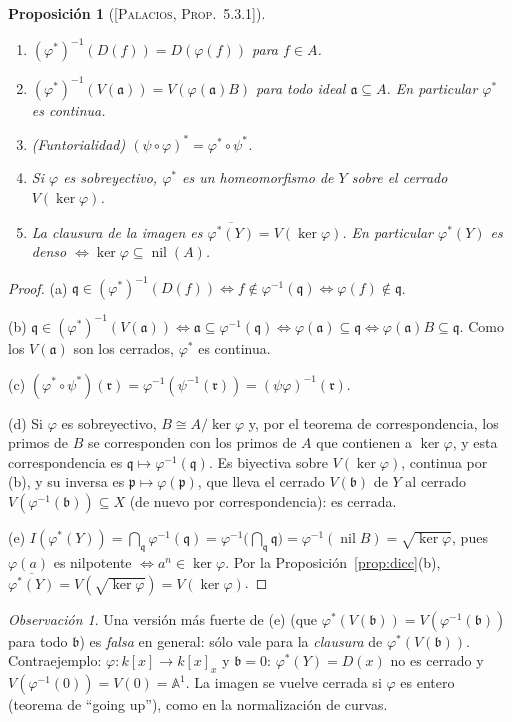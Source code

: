 \documentclass[11pt,a4paper]{article}
\newcommand{\nil}{\operatorname{nil}}
\newcommand{\A}{\mathbb{A}}
\newcommand{\pp}{\mathfrak{p}}
\newcommand{\qq}{\mathfrak{q}}
\newcommand{\aaa}{\mathfrak{a}}
\newcommand{\bbb}{\mathfrak{b}}
\theoremstyle{plain}
\newtheorem{proposicion}[teorema]{Proposición}
\theoremstyle{definition}
\theoremstyle{remark}
\newtheorem*{obs}{Observación}
\newcounter{ej}
\newcommand{\libro}[1]{\textsc{[Palacios, #1]}}
\begin{document}
\begin{proposicion}[{\libro{Prop.~5.3.1}}]\label{prop:phi}
\begin{enumerate}[label=(\alph*),itemsep=2pt]
\item $(\varphi^*)^{-1}(D(f))=D(\varphi(f))$ para $f\in A$.
\item $(\varphi^*)^{-1}(V(\aaa))=V(\varphi(\aaa)B)$ para todo ideal $\aaa\subseteq A$. En particular $\varphi^*$ es continua.
\item (\emph{Funtorialidad}) $(\psi\circ\varphi)^*=\varphi^*\circ\psi^*$.
\item Si $\varphi$ es \emph{sobreyectivo}, $\varphi^*$ es un homeomorfismo de $Y$ sobre el cerrado $V(\ker\varphi)$.
\item La clausura de la imagen es $\overline{\varphi^*(Y)}=V(\ker\varphi)$. En particular $\varphi^*(Y)$ es denso $\iff\ker\varphi\subseteq\nil(A)$.
\end{enumerate}
\end{proposicion}
\begin{proof}
(a) $\qq\in(\varphi^*)^{-1}(D(f))\iff f\notin\varphi^{-1}(\qq)\iff\varphi(f)\notin\qq$.

(b) $\qq\in(\varphi^*)^{-1}(V(\aaa))\iff\aaa\subseteq\varphi^{-1}(\qq)\iff\varphi(\aaa)\subseteq\qq\iff\varphi(\aaa)B\subseteq\qq$. Como los $V(\aaa)$ son los cerrados, $\varphi^*$ es continua.

(c) $(\varphi^*\circ\psi^*)(\mathfrak r)=\varphi^{-1}(\psi^{-1}(\mathfrak r))=(\psi\varphi)^{-1}(\mathfrak r)$.

(d) Si $\varphi$ es sobreyectivo, $B\cong A/\ker\varphi$ y, por el teorema de correspondencia, los primos de $B$ se corresponden con los primos de $A$ que contienen a $\ker\varphi$, y esta correspondencia es $\qq\mapsto\varphi^{-1}(\qq)$. Es biyectiva sobre $V(\ker\varphi)$, continua por (b), y su inversa es $\pp\mapsto\varphi(\pp)$, que lleva el cerrado $V(\bbb)$ de $Y$ al cerrado $V(\varphi^{-1}(\bbb))\subseteq X$ (de nuevo por correspondencia): es cerrada.

(e) $I(\varphi^*(Y))=\bigcap_\qq\varphi^{-1}(\qq)=\varphi^{-1}\big(\bigcap_\qq\qq\big)=\varphi^{-1}(\nil B)=\sqrt{\ker\varphi}$, pues $\varphi(a)$ es nilpotente $\iff a^n\in\ker\varphi$. Por la Proposición~\ref{prop:dicc}(b), $\overline{\varphi^*(Y)}=V(\sqrt{\ker\varphi})=V(\ker\varphi)$.
\end{proof}

\begin{obs}
Una versión más fuerte de (e) (que $\varphi^*(V(\bbb))=V(\varphi^{-1}(\bbb))$ para todo $\bbb$) es \emph{falsa} en general: sólo vale para la \emph{clausura} de $\varphi^*(V(\bbb))$. Contraejemplo: $\varphi:k[x]\to k[x]_x$ y $\bbb=0$: $\varphi^*(Y)=D(x)$ no es cerrado y $V(\varphi^{-1}(0))=V(0)=\A^1$. La imagen se vuelve cerrada si $\varphi$ es entero (teorema de ``going up''), como en la normalización de curvas.
\end{obs}
\end{document}

